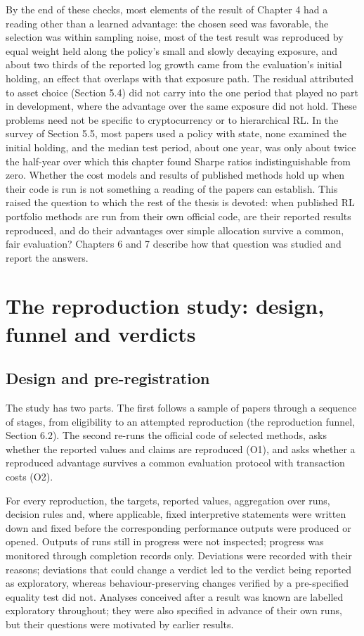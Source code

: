 \documentclass[12pt,a4paper]{report}
\newcounter{none} %
\begin{document}
By the end of these checks, most elements of the result of Chapter 4 had
a reading other than a learned advantage: the chosen seed was favorable,
the selection was within sampling noise, most of the test result was
reproduced by equal weight held along the policy's small and slowly
decaying exposure, and about two thirds of the reported log growth came
from the evaluation's initial holding, an effect that overlaps with that
exposure path. The residual attributed to asset choice (Section 5.4) did
not carry into the one period that played no part in development, where
the advantage over the same exposure did not hold. These problems need
not be specific to cryptocurrency or to hierarchical RL. In the survey
of Section 5.5, most papers used a policy with state, none examined the
initial holding, and the median test period, about one year, was only
about twice the half-year over which this chapter found Sharpe ratios
indistinguishable from zero. Whether the cost models and results of
published methods hold up when their code is run is not something a
reading of the papers can establish. This raised the question to which
the rest of the thesis is devoted: when published RL portfolio methods
are run from their own official code, are their reported results
reproduced, and do their advantages over simple allocation survive a
common, fair evaluation? Chapters 6 and 7 describe how that question was
studied and report the answers.

\chapter{The reproduction study: design, funnel and
verdicts}\label{chapter-6.-the-reproduction-study-design-funnel-and-verdicts}

\section{Design and pre-registration}\label{design-and-pre-registration}

The study has two parts. The first follows a sample of papers through a
sequence of stages, from eligibility to an attempted reproduction (the
reproduction funnel, Section 6.2). The second re-runs the official code
of selected methods, asks whether the reported values and claims are
reproduced (O1), and asks whether a reproduced advantage survives a
common evaluation protocol with transaction costs (O2).

For every reproduction, the targets, reported values, aggregation over
runs, decision rules and, where applicable, fixed interpretive
statements were written down and fixed before the corresponding
performance outputs were produced or opened. Outputs of runs still in
progress were not inspected; progress was monitored through completion
records only. Deviations were recorded with their reasons; deviations
that could change a verdict led to the verdict being reported as
exploratory, whereas behaviour-preserving changes verified by a
pre-specified equality test did not. Analyses conceived after a result
was known are labelled exploratory throughout; they were also specified
in advance of their own runs, but their questions were motivated by
earlier results.
\end{document}
